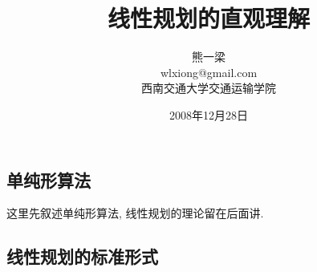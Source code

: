 \documentclass[a4paper,12pt]{article}
\begin{document}
\begin{CJK*}{UTF8}{gbsn}

\theoremstyle{definition}
\newtheorem{thm}{定理}
\newtheorem{cor}{推论}
\newtheorem{define}{定义}

\title{线性规划的直观理解}
\author{熊一梁\\wlxiong@gmail.com\\西南交通大学交通运输学院}
\date{2008年12月28日}

\maketitle





\section{单纯形算法}
这里先叙述单纯形算法, 线性规划的理论留在后面讲. 

\subsection{线性规划的标准形式}


\end{CJK*}
\end{document}
